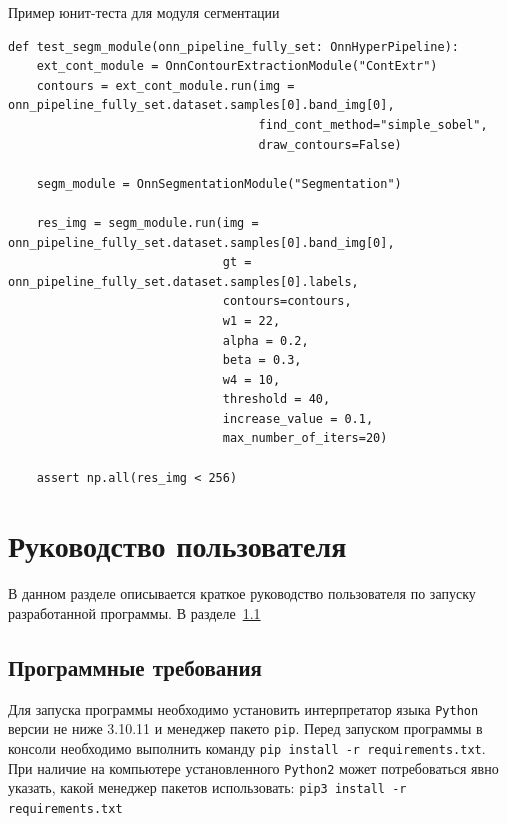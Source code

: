 \documentclass[14pt, russian]{scrartcl}
\begin{document}
\begin{listing}[!htt]
    \caption{Пример юнит-теста для модуля сегментации}
    \label{lst:contour_extr_sobel}
    \begin{verbatim}
def test_segm_module(onn_pipeline_fully_set: OnnHyperPipeline):
    ext_cont_module = OnnContourExtractionModule("ContExtr")
    contours = ext_cont_module.run(img = onn_pipeline_fully_set.dataset.samples[0].band_img[0], 
                                   find_cont_method="simple_sobel",
                                   draw_contours=False)

    segm_module = OnnSegmentationModule("Segmentation")

    res_img = segm_module.run(img = onn_pipeline_fully_set.dataset.samples[0].band_img[0],
                              gt = onn_pipeline_fully_set.dataset.samples[0].labels,
                              contours=contours,
                              w1 = 22,
                              alpha = 0.2,
                              beta = 0.3,
                              w4 = 10,
                              threshold = 40,
                              increase_value = 0.1,
                              max_number_of_iters=20)

    assert np.all(res_img < 256)
    \end{verbatim}
\end{listing}

\section{Руководство пользователя}

В данном разделе описывается краткое руководство пользователя по запуску разработанной программы. В разделе~\ref{subsect::program_req}

\subsection{Программные требования}\label{subsect::program_req}

Для запуска программы необходимо установить интерпретатор языка \texttt{Python} версии не ниже 3.10.11 и менеджер пакето \texttt{pip}.
Перед запуском программы в консоли необходимо выполнить команду \texttt{pip install -r requirements.txt}. При наличие на компьютере установленного \texttt{Python2} 
может потребоваться явно указать, какой менеджер пакетов использовать: \texttt{pip3 install -r requirements.txt}
\end{document}
